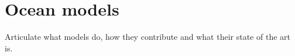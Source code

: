 \section{Ocean models}

Articulate what models do, how they contribute and what their state of the art is. 